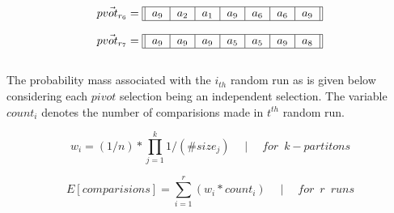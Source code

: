 \documentclass[usenames,dvipsnames,acmsmall]{acmart}
\begin{document}
\begin{equation}
	\vec{pvot_{r_{6}}} = \begin{tabular}{||c|c|c|c|c|c|c||}
		\hline
		$a_9$ & $a_2$ & $a_1$ & $a_9$ & $a_6$ & $a_6$ & $a_9$ \\
		\hline
	\end{tabular}
\end{equation} 

\begin{equation}
	\vec{pvot_{r_{7}}} = \begin{tabular}{||c|c|c|c|c|c|c||}
		\hline
		$a_9$ & $a_9$ & $a_9$ & $a_5$ & $a_5$ & $a_9$ & $a_8$ \\
		\hline
	\end{tabular}
\end{equation} \\

The probability mass associated with the $i_{th}$ random run as is given below considering each $pivot$ selection being an independent selection. The variable $count_i$ denotes the number of comparisions made in $t^{th}$ random run.

\begin{equation}
	w_i = (1 / n) * \prod_{j=1}^{k} 1 / (\#size_j) \quad \mid \quad for \enspace k-partitons
\end{equation}

\begin{equation}
	E[comparisions] = \sum_{i=1}^{r} (w_i * count_i) \quad \mid \quad for \enspace r \enspace runs
\end{equation}
\end{document}
